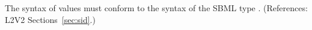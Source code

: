 The syntax of   values must conform to the syntax of the
SBML type .  (References: L2V2 Sections~\ref{sec:sid}.)
